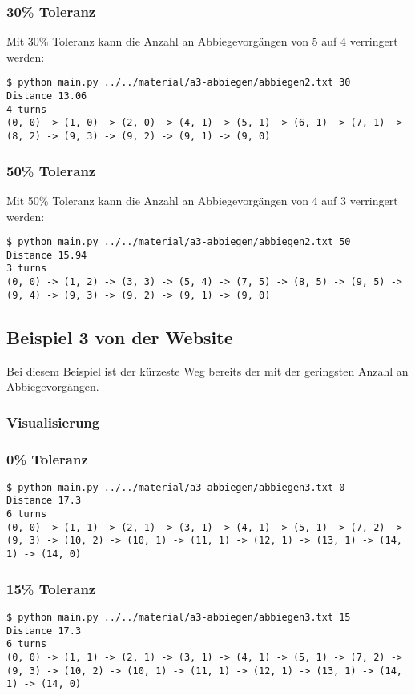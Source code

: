 \documentclass[a4paper,10pt,ngerman]{scrartcl}
\begin{document}
\subsubsection{30\% Toleranz}
Mit 30\% Toleranz kann die Anzahl an Abbiegevorgängen von 5 auf 4 verringert werden:
\begin{lstlisting}
$ python main.py ../../material/a3-abbiegen/abbiegen2.txt 30
Distance 13.06
4 turns
(0, 0) -> (1, 0) -> (2, 0) -> (4, 1) -> (5, 1) -> (6, 1) -> (7, 1) -> (8, 2) -> (9, 3) -> (9, 2) -> (9, 1) -> (9, 0)
\end{lstlisting}

\subsubsection{50\% Toleranz}
Mit 50\% Toleranz kann die Anzahl an Abbiegevorgängen von 4 auf 3 verringert werden:
\begin{lstlisting}
$ python main.py ../../material/a3-abbiegen/abbiegen2.txt 50
Distance 15.94
3 turns
(0, 0) -> (1, 2) -> (3, 3) -> (5, 4) -> (7, 5) -> (8, 5) -> (9, 5) -> (9, 4) -> (9, 3) -> (9, 2) -> (9, 1) -> (9, 0)
\end{lstlisting}


\subsection{Beispiel 3 von der Website}
Bei diesem Beispiel ist der kürzeste Weg bereits der mit der geringsten Anzahl an Abbiegevorgängen.
\subsubsection{Visualisierung}


\subsubsection{0\% Toleranz}
\begin{lstlisting}
$ python main.py ../../material/a3-abbiegen/abbiegen3.txt 0
Distance 17.3
6 turns
(0, 0) -> (1, 1) -> (2, 1) -> (3, 1) -> (4, 1) -> (5, 1) -> (7, 2) -> (9, 3) -> (10, 2) -> (10, 1) -> (11, 1) -> (12, 1) -> (13, 1) -> (14, 1) -> (14, 0)
\end{lstlisting}

\subsubsection{15\% Toleranz}
\begin{lstlisting}
$ python main.py ../../material/a3-abbiegen/abbiegen3.txt 15
Distance 17.3
6 turns
(0, 0) -> (1, 1) -> (2, 1) -> (3, 1) -> (4, 1) -> (5, 1) -> (7, 2) -> (9, 3) -> (10, 2) -> (10, 1) -> (11, 1) -> (12, 1) -> (13, 1) -> (14, 1) -> (14, 0)
\end{lstlisting}
\end{document}
